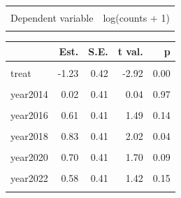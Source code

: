 \documentclass[
]{article}
\begin{document}
\begin{table}[!h]
\centering
\begin{tabular}{lr}
\toprule
\cellcolor{gray!10}{Observations} & \cellcolor{gray!10}{466}\\
Dependent variable & log(counts + 1)\\
\cellcolor{gray!10}{Type} & \cellcolor{gray!10}{OLS linear regression}\\
\bottomrule
\end{tabular}
\end{table}  \begin{table}[!h]
\centering
\begin{threeparttable}
\begin{tabular}{lrrrr}
\toprule
  & Est. & S.E. & t val. & p\\
\midrule
\cellcolor{gray!10}{(Intercept)} & \cellcolor{gray!10}{1.95} & \cellcolor{gray!10}{0.29} & \cellcolor{gray!10}{6.71} & \cellcolor{gray!10}{0.00}\\
treat & -1.23 & 0.42 & -2.92 & 0.00\\
\cellcolor{gray!10}{year2013} & \cellcolor{gray!10}{-0.27} & \cellcolor{gray!10}{0.41} & \cellcolor{gray!10}{-0.65} & \cellcolor{gray!10}{0.51}\\
year2014 & 0.02 & 0.41 & 0.04 & 0.97\\
\cellcolor{gray!10}{year2015} & \cellcolor{gray!10}{0.49} & \cellcolor{gray!10}{0.41} & \cellcolor{gray!10}{1.20} & \cellcolor{gray!10}{0.23}\\
\addlinespace
year2016 & 0.61 & 0.41 & 1.49 & 0.14\\
\cellcolor{gray!10}{year2017} & \cellcolor{gray!10}{1.04} & \cellcolor{gray!10}{0.41} & \cellcolor{gray!10}{2.53} & \cellcolor{gray!10}{0.01}\\
year2018 & 0.83 & 0.41 & 2.02 & 0.04\\
\cellcolor{gray!10}{year2019} & \cellcolor{gray!10}{0.76} & \cellcolor{gray!10}{0.41} & \cellcolor{gray!10}{1.84} & \cellcolor{gray!10}{0.07}\\
year2020 & 0.70 & 0.41 & 1.70 & 0.09\\
\addlinespace
\cellcolor{gray!10}{year2021} & \cellcolor{gray!10}{0.29} & \cellcolor{gray!10}{0.41} & \cellcolor{gray!10}{0.71} & \cellcolor{gray!10}{0.48}\\
year2022 & 0.58 & 0.41 & 1.42 & 0.15\\
\cellcolor{gray!10}{year2023} & \cellcolor{gray!10}{1.71} & \cellcolor{gray!10}{0.41} & \cellcolor{gray!10}{4.17} & \cellcolor{gray!10}{0.00}\\

\end{tabular}
\end{threeparttable}
\end{table}
\end{document}
